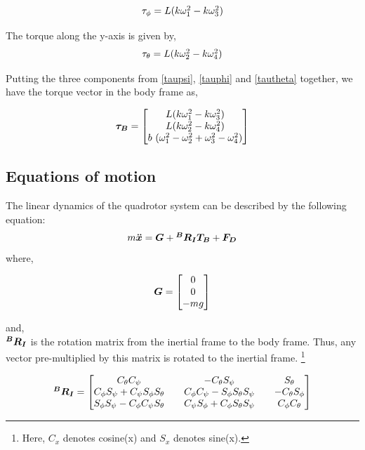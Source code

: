\documentclass[12pt,fleqn]{article}
\newcommand{\mbm}[1]{\mbox{\boldmath $#1$}}
\begin{document}
\begin{equation} \label{tauphi}
$$ \tau_\phi = L (k\omega_1^2 - k\omega_3^2) $$
\end{equation}

The torque along the y-axis is given by,
\begin{equation} \label{tautheta}
$$ \tau_\theta = L (k\omega_2^2 - k\omega_4^2) $$
\end{equation}

Putting the three components from \ref{taupsi}, \ref{tauphi} and
\ref{tautheta} together, we have the torque vector in the body frame as,

\begin{equation} \label{tauvector} 
$$ \mbm{\tau_B} = \begin{bmatrix} L (k\omega_1^2 - k\omega_3^2)\\ L
  (k\omega_2^2 - k\omega_4^2) \\ b\ (\omega_1^2 - \omega_2^2 + \omega_3^2 -
\omega_4^2) \end{bmatrix} $$
\end{equation}

\subsection{Equations of motion}

The linear dynamics of the quadrotor system can be described by the
following equation:
\begin{equation} \label{eom_linear}
$$ m \mbm{\ddot{x}} = \mbm{G} + \mbm{^BR_IT_{B}} + \mbm{F_{D}} $$
\end{equation}
where, 

$$ \mbm{G} = \begin{bmatrix} 0 \\ 0 \\ -mg \end{bmatrix} $$

and,\\ 

$ \mbm{^BR_I} $ is the rotation matrix from the inertial frame to the
body frame. Thus, any vector pre-multiplied by this matrix is
rotated to the inertial frame. \footnote{Here, $C_x$ denotes cosine(x) and $S_x$ denotes sine(x).}

\begin{equation} \label{rotation_matrix}
$$ \mbm{^BR_I} = \begin{bmatrix} C_\theta C_\psi && -C_\theta S_\psi && S_\theta\\
C_\phi S_\psi + C_\psi S_\phi S_\theta&& C_\phi C_\psi - S_\phi
S_\theta S_\psi&& -C_\theta S_\phi\\
S_\phi S_\psi - C_\phi C_\psi S_\theta&&
C_\psi S_\phi + C_\phi S_\theta S_\psi&&
C_\phi C_\theta \end{bmatrix} $$
\\
\end{equation}
\end{document}
